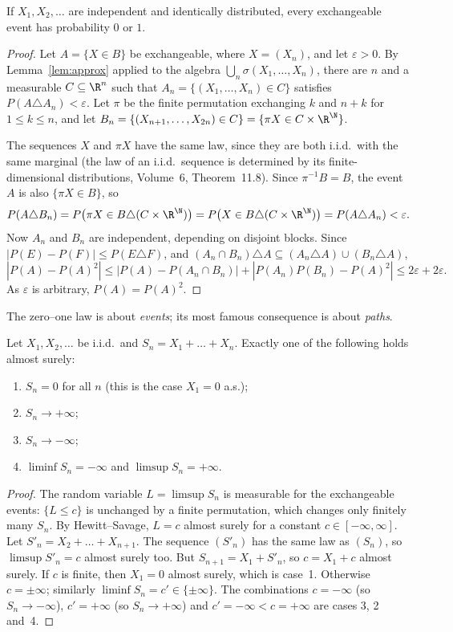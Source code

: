 \begin{theorem}\label{thm:hewittsavage}
If $X_1,X_2,\dots$ are independent and identically distributed, every exchangeable event has probability $0$ or $1$.
\end{theorem}
\begin{proof}
Let $A=\{X\in B\}$ be exchangeable, where $X=(X_n)$, and let $\varepsilon>0$. By Lemma~\ref{lem:approx} applied to the
algebra $\bigcup_n\sigma(X_1,\dots,X_n)$, there are $n$ and a measurable $C\subseteq\R^n$ such that $A_n=\{(X_1,\dots,X_n)\in
C\}$ satisfies $P(A\triangle A_n)<\varepsilon$. Let $\pi$ be the finite permutation exchanging $k$ and $n+k$ for $1\le k\le n$,
and let $B_n=\{(X_{n+1},\dots,X_{2n})\in C\}=\{\pi X\in C\times\R^{\N}\}$.

The sequences $X$ and $\pi X$ have the same law, since they are both i.i.d.\ with the same marginal (the law of an i.i.d.\
sequence is determined by its finite-dimensional distributions, Volume~6, Theorem~11.8). Since $\pi^{-1}B=B$, the event
$A$ is also $\{\pi X\in B\}$, so
\[
P(A\triangle B_n)=P\bigl(\pi X\in B\triangle(C\times\R^\N)\bigr)=P\bigl(X\in B\triangle(C\times\R^\N)\bigr)=P(A\triangle A_n)<\varepsilon.
\]
Now $A_n$ and $B_n$ are independent, depending on disjoint blocks. Since $|P(E)-P(F)|\le P(E\triangle F)$, and $(A_n\cap
B_n)\triangle A\subseteq(A_n\triangle A)\cup(B_n\triangle A)$,
\[
|P(A)-P(A)^2|\le|P(A)-P(A_n\cap B_n)|+|P(A_n)P(B_n)-P(A)^2|\le2\varepsilon+2\varepsilon.
\]
As $\varepsilon$ is arbitrary, $P(A)=P(A)^2$.
\end{proof}

The zero--one law is about \emph{events}; its most famous consequence is about \emph{paths}.

\begin{theorem}\label{thm:trichotomy}
Let $X_1,X_2,\dots$ be i.i.d.\ and $S_n=X_1+\dots+X_n$. Exactly one of the following holds almost surely:
\begin{enumerate}
\item $S_n=0$ for all $n$ (this is the case $X_1=0$ a.s.);
\item $S_n\to+\infty$;
\item $S_n\to-\infty$;
\item $\liminf S_n=-\infty$ and $\limsup S_n=+\infty$.
\end{enumerate}
\end{theorem}
\begin{proof}
The random variable $L=\limsup S_n$ is measurable for the exchangeable events: $\{L\le c\}$ is unchanged by a finite
permutation, which changes only finitely many $S_n$. By Hewitt--Savage, $L=c$ almost surely for a constant
$c\in[-\infty,\infty]$. Let $S'_n=X_2+\dots+X_{n+1}$. The sequence $(S'_n)$ has the same law as $(S_n)$, so $\limsup S'_n=c$
almost surely too. But $S_{n+1}=X_1+S'_n$, so $c=X_1+c$ almost surely. If $c$ is finite, then $X_1=0$ almost surely, which
is case~1. Otherwise $c=\pm\infty$; similarly $\liminf S_n=c'\in\{\pm\infty\}$. The combinations $c=-\infty$ (so $S_n\to-\infty$),
$c'=+\infty$ (so $S_n\to+\infty$) and $c'=-\infty<c=+\infty$ are cases 3, 2 and~4.
\end{proof}

